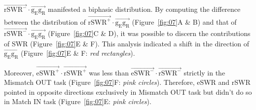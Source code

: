 $\overrightarrow{\mathrm{rSWR^-}} \cdot \overrightarrow{\mathrm{g_{E}g_{R}}}$ manifested a biphasic distribution. By computing the difference between the distribution of $\overrightarrow{\mathrm{rSWR^+}} \cdot \overrightarrow{\mathrm{g_{E}g_{R}}}$ (Figure~\ref{fig:07}A \& B) and that of $\overrightarrow{\mathrm{rSWR^-}} \cdot \overrightarrow{\mathrm{g_{E}g_{R}}}$ (Figure~\ref{fig:07}C \& D), it was possible to discern the contributions of SWR (Figure~\ref{fig:07}E \& F). This analysis indicated a shift in the direction of $\overrightarrow{\mathrm{g_{E}g_{R}}}$ (Figure~\ref{fig:07}E \& F: \textit{red rectangles}). 

Moreover, $\overrightarrow{\mathrm{eSWR^+}} \cdot \overrightarrow{\mathrm{rSWR^+}}$ was less than $\overrightarrow{\mathrm{eSWR^-}} \cdot \overrightarrow{\mathrm{rSWR^-}}$ strictly in the Mismatch OUT task (Figure~\ref{fig:07}F: \textit{pink circles}). Therefore, eSWR and rSWR pointed in opposite directions exclusively in Mismatch OUT task but didn't do so in Match IN task (Figure~\ref{fig:07}E: \textit{pink circles}).
\label{sec:results}